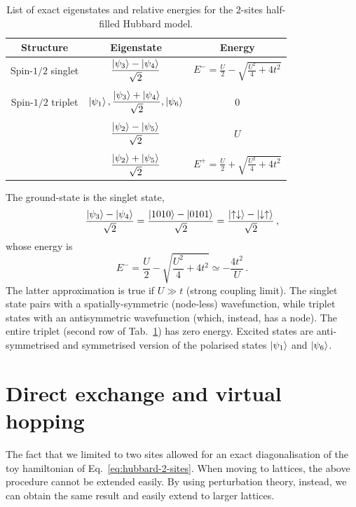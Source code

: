 \begin{table}
	\centering
	\begin{tabular}{c c c}
		\textbf{Structure} & \textbf{Eigenstate} & \textbf{Energy} \\
		\midrule
		Spin-$1/2$ singlet & $\displaystyle \frac{\ket{\psi_3} - \ket{\psi_4}}{\sqrt{2}}$ & $\displaystyle E^- = \frac{U}{2} - \sqrt{\frac{U^2}{4} + 4t^2}$ \\
		&&\\ %
		Spin-$1/2$ triplet & $\ket{\psi_1}, \displaystyle \frac{\ket{\psi_3} + \ket{\psi_4}}{\sqrt{2}}, \ket{\psi_6}$ & 0 \\
		&&\\ %
		&$\displaystyle \frac{\ket{\psi_2}-\ket{\psi_5}}{\sqrt{2}}$ & $U$\\
		&&\\ %
		&$\displaystyle \frac{\ket{\psi_2}+\ket{\psi_5}}{\sqrt{2}}$ & $\displaystyle E^+ = \frac{U}{2} + \sqrt{\frac{U^2}{4} + 4t^2}$ \\
		\midrule
	\end{tabular}
	\caption{List of exact eigenstates and relative energies for the $2$-sites half-filled Hubbard model.}
	\label{apptab:two-sites-hubbard-model-eigenstates}
\end{table}

The ground-state is the singlet state,
\[
	\frac{\ket{\psi_3} - \ket{\psi_4}}{\sqrt{2}} = \frac{\ket{1010} - \ket{0101}}{\sqrt{2}} = \frac{\ket{\uparrow\downarrow} - \ket{\downarrow\uparrow}}{\sqrt{2}} \, ,
\]
whose energy is
\[
	E^- = \frac{U}{2} - \sqrt{\frac{U^2}{4} + 4t^2} \simeq - \frac{4t^2}{U} \, .
\]
The latter approximation is true if $U \gg t$ (strong coupling limit). The singlet state pairs with a spatially-symmetric (node-less) wavefunction, while triplet states with an antisymmetric wavefunction (which, instead, has a node). The entire triplet (second row of Tab.~\ref{apptab:two-sites-hubbard-model-eigenstates}) has zero energy. Excited states are anti-symmetrised and symmetrised version of the polarised states $\ket{\psi_1}$ and $\ket{\psi_6}$.

\section{Direct exchange and virtual hopping}\label{appsec:direct-exchange}

The fact that we limited to two sites allowed for an exact diagonalisation of the toy hamiltonian of Eq.~\eqref{eq:hubbard-2-sites}. When moving to lattices, the above procedure cannot be extended easily. By using perturbation theory, instead, we can obtain the same result and easily extend to larger lattices.

